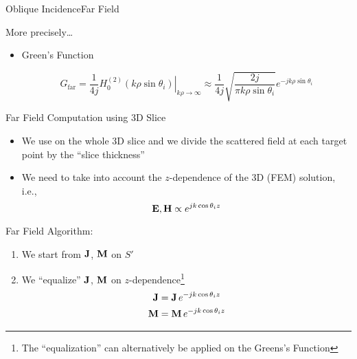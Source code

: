 \begin{frame}[allowframebreaks]{Oblique Incidence}{Far Field}
  \begin{block}{More precisely\ldots}
    \begin{itemize}
    \item Green's Function 

      \begin{equation*}
        G_\text{far} = \dfrac{1}{4j}
        \left.
          H_0^{(2)}\left( k\rho\sin\theta_i\right)
        \right|_{k\rho\rightarrow\infty} \approx
         \dfrac{1}{4j} \sqrt{\dfrac{2j}{\pi k\rho\sin\theta_i}}
        e^{-j k \rho \sin\theta_i}
      \end{equation*}
      
    \end{itemize}

  \end{block}

  \framebreak %
  
  \begin{block}{Far Field Computation using 3D Slice}
    \begin{itemize}
    \item We use {\GreenD} on the whole 3D slice and we divide the
      scattered field at each target point by the ``slice thickness''
      
    \item We need to take into account the $z$-dependence of the
      3D (FEM) solution, i.e.,
      \begin{equation*}
        \mathbf{E},\mathbf{H} \propto   e^{j k \cos\theta_i z}
      \end{equation*}
      
    \end{itemize}

  \end{block}
  
  \framebreak %
  
  \begin{block}{Far Field Algorithm:}
  \end{block}
  
    \begin{enumerate}
    \item We start from $\mathbf{J}$, $\mathbf{M}$ on $S'$

    \item We ``equalize'' $\mathbf{J}$, $\mathbf{M}$ on $z$-dependence\footnote{The
        ``equalization'' can alternatively be applied on the Greens's
        Function}
       \begin{align*}
         \mathbf{J} &= \mathbf{J} \, e^{-j k \cos\theta_i z} \\
         \mathbf{M} &= \mathbf{M} \, e^{-j k \cos\theta_i z} 
       \end{align*}


\end{enumerate}
\end{frame}
